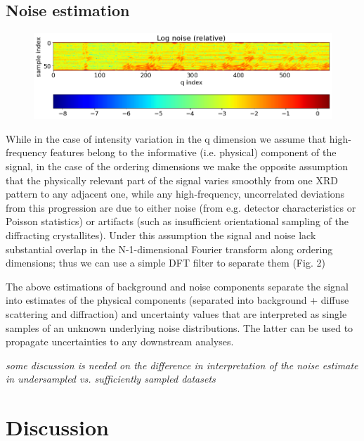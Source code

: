 \documentclass[12pt]{iopart}
\begin{document}
\subsection{Noise estimation}
\begin{figure}
  \includegraphics[width=\linewidth]{figures/noise.png}
  \caption{}
  \label{fig:noise}
\end{figure}
While in the case of intensity variation in the q dimension we assume
that high-frequency features belong to the informative (i.e. physical)
component of the signal, in the case of the ordering dimensions we
make the opposite assumption that the physically relevant part of the
signal varies smoothly from one XRD pattern to any adjacent one, while
any high-frequency, uncorrelated deviations from this progression are
due to either noise (from e.g. detector characteristics or Poisson
statistics) or artifacts (such as insufficient orientational sampling
of the diffracting crystallites). Under this assumption the signal and
noise lack substantial overlap in the N-1-dimensional Fourier transform
along ordering dimensions; thus we can use a simple DFT filter to
separate them (Fig. 2)

The above estimations of background and noise components separate
the signal into estimates of the physical components (separated into
background + diffuse scattering and diffraction) and uncertainty values
that are interpreted as single samples of an unknown underlying noise distributions.
The latter can be used to propagate uncertainties to any downstream analyses.

\emph{some discussion is needed on the difference in interpretation of the noise estimate in undersampled vs. sufficiently sampled datasets}

\section{Discussion}
\end{document}
